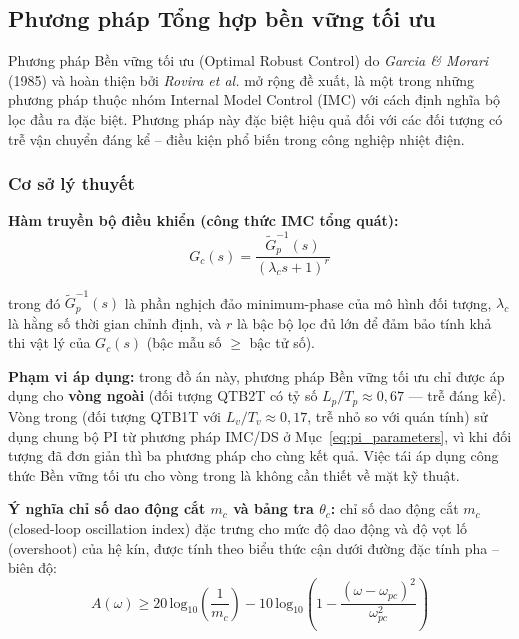 \documentclass[../main.tex]{subfiles}
\begin{document}
\subsection{Phương pháp Tổng hợp bền vững tối ưu}

Phương pháp Bền vững tối ưu (Optimal Robust Control) do \textit{Garcia \& Morari} (1985) và hoàn thiện bởi \textit{Rovira et al.} mở rộng đề xuất, là một trong những phương pháp thuộc nhóm Internal Model Control (IMC) với cách định nghĩa bộ lọc đầu ra đặc biệt. Phương pháp này đặc biệt hiệu quả đối với các đối tượng có trễ vận chuyển đáng kể -- điều kiện phổ biến trong công nghiệp nhiệt điện.

\subsubsection{Cơ sở lý thuyết}

\textbf{Hàm truyền bộ điều khiển (công thức IMC tổng quát):}
\begin{equation}
    G_c(s) = \frac{\tilde{G}_p^{-1}(s)}{(\lambda_c s + 1)^r}
    \label{eq:robust_controller}
\end{equation}

trong đó $\tilde{G}_p^{-1}(s)$ là phần nghịch đảo minimum-phase của mô hình đối tượng, $\lambda_c$ là hằng số thời gian chỉnh định, và $r$ là bậc bộ lọc đủ lớn để đảm bảo tính khả thi vật lý của $G_c(s)$ (bậc mẫu số $\geq$ bậc tử số).

\textbf{Phạm vi áp dụng:} trong đồ án này, phương pháp Bền vững tối ưu chỉ được áp dụng cho \textbf{vòng ngoài} (đối tượng QTB2T có tỷ số $L_p/T_p \approx 0{,}67$ — trễ đáng kể). Vòng trong (đối tượng QTB1T với $L_v/T_v \approx 0{,}17$, trễ nhỏ so với quán tính) sử dụng chung bộ PI từ phương pháp IMC/DS ở Mục~\ref{eq:pi_parameters}, vì khi đối tượng đã đơn giản thì ba phương pháp cho cùng kết quả. Việc tái áp dụng công thức Bền vững tối ưu cho vòng trong là không cần thiết về mặt kỹ thuật.

\textbf{Ý nghĩa chỉ số dao động cắt $m_c$ và bảng tra $\theta_c$:} chỉ số dao động cắt $m_c$ (closed-loop oscillation index) đặc trưng cho mức độ dao động và độ vọt lố (overshoot) của hệ kín, được tính theo biểu thức cận dưới đường đặc tính pha -- biên độ:
\begin{equation}
    A(\omega) \geq 20\,\mathrm{log}_{10}\!\left(\frac{1}{m_c}\right) - 10\,\mathrm{log}_{10}\!\left(1 - \frac{(\omega - \omega_{pc})^2}{\omega_{pc}^2}\right)
    \label{eq:mc_phase_margin}
\end{equation}
\end{document}
